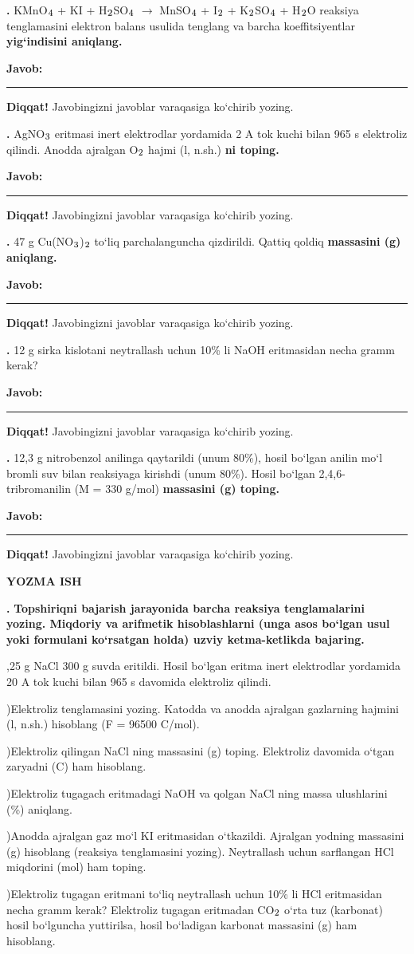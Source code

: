 \documentclass[11pt,a4paper]{article}
\renewcommand{\textsubscript}[1]{\ensuremath{_{\text{\fontsize{8}{8}\selectfont #1}}}}
\newcommand{\qn}[1]{\textbf{\fontsize{11.5}{13}\selectfont #1}}
\newcommand{\qsep}{\par\vspace{1pt}\noindent\rule{0pt}{0.4pt}\par\vspace{5pt}}
\newcommand{\javob}{\par\smallskip\noindent\textbf{Javob:} \rule[-2pt]{7.5cm}{0.4pt}\par\smallskip\noindent\textbf{Diqqat!} Javobingizni javoblar varaqasiga ko`chirib yozing.\par\medskip}
\begin{document}
\par\bigskip
\noindent\qn{36.} KMnO\textsubscript{4} + KI + H\textsubscript{2}SO\textsubscript{4} $\to$ MnSO\textsubscript{4} + I\textsubscript{2} + K\textsubscript{2}SO\textsubscript{4} + H\textsubscript{2}O reaksiya tenglamasini elektron balans usulida tenglang va barcha koeffitsiyentlar \textbf{yig`indisini aniqlang.}
\javob\qsep
\noindent\qn{37.} AgNO\textsubscript{3} eritmasi inert elektrodlar yordamida 2 A tok kuchi bilan 965 s elektroliz qilindi. Anodda ajralgan O\textsubscript{2} hajmi (l, n.sh.) \textbf{ni toping.}
\javob\qsep
\noindent\qn{38.} 47 g Cu(NO\textsubscript{3})\textsubscript{2} to`liq parchalanguncha qizdirildi. Qattiq qoldiq \textbf{massasini (g) aniqlang.}
\javob\qsep
\noindent\qn{39.} 12 g sirka kislotani neytrallash uchun 10\% li NaOH eritmasidan necha gramm kerak?
\javob\qsep
\noindent\qn{40.} 12,3 g nitrobenzol anilinga qaytarildi (unum 80\%), hosil bo`lgan anilin mo`l bromli suv bilan reaksiyaga kirishdi (unum 80\%). Hosil bo`lgan 2,4,6-tribromanilin (M = 330 g/mol) \textbf{massasini (g) toping.}
\javob\qsep
\par\bigskip\begin{center}\textbf{\fontsize{13}{15}\selectfont YOZMA ISH}\end{center}
\noindent\qn{41.} \textbf{Topshiriqni bajarish jarayonida barcha reaksiya tenglamalarini yozing. Miqdoriy va arifmetik hisoblashlarni (unga asos bo`lgan usul yoki formulani ko`rsatgan holda) uzviy ketma-ketlikda bajaring.}\par{},25 g NaCl 300 g suvda eritildi. Hosil bo`lgan eritma inert elektrodlar yordamida 20 A tok kuchi bilan 965 s davomida elektroliz qilindi.\par
{})Elektroliz tenglamasini yozing. Katodda va anodda ajralgan gazlarning hajmini (l, n.sh.) hisoblang (F = 96500 C/mol).\par
{})Elektroliz qilingan NaCl ning massasini (g) toping. Elektroliz davomida o`tgan zaryadni (C) ham hisoblang.\par
{})Elektroliz tugagach eritmadagi NaOH va qolgan NaCl ning massa ulushlarini (\%) aniqlang.\par
{})Anodda ajralgan gaz mo`l KI eritmasidan o`tkazildi. Ajralgan yodning massasini (g) hisoblang (reaksiya tenglamasini yozing). Neytrallash uchun sarflangan HCl miqdorini (mol) ham toping.\par
{})Elektroliz tugagan eritmani to`liq neytrallash uchun 10\% li HCl eritmasidan necha gramm kerak? Elektroliz tugagan eritmadan CO\textsubscript{2} o`rta tuz (karbonat) hosil bo`lguncha yuttirilsa, hosil bo`ladigan karbonat massasini (g) ham hisoblang.\par
\end{document}
